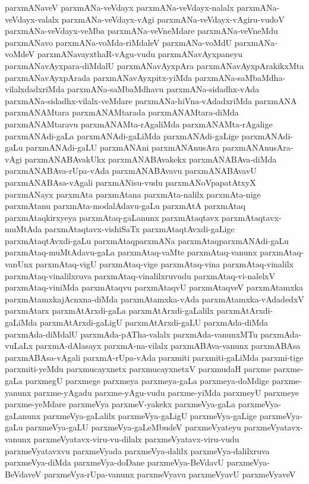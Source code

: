 {parxmANaveV
parxmANa-veVdayx
parxmANa-veVdayx-nalalx
parxmANa-veVdayx-valalx
parxmANa-veVdayx-vAgi
parxmANa-veVdayx-vAgiru-vudoV
parxmANa-veVdayx-veMba
parxmANa-veVneMdare
parxmANa-veVneMdu
parxmANavo
parxmANa-voMda-riMdaleV
parxmANa-voMdU
parxmANa-voMdeV
parxmANavayxthaR-vAgu-vudu
parxmANavAyxpaneyu
parxmANavAyxpara-diMdalU
parxmANavAyxpAra
parxmANavAyxpArakikxMta
parxmANavAyxpArada
parxmANavAyxpitx-yiMda
parxmANa-saMbaMdha-vilalxdadxriMda
parxmANa-saMbaMdhavu
parxmANa-sidadhx-vAda
parxmANa-sidadhx-vilalx-veMdare
parxmANa-hiVna-vAdadxriMda
parxmANA
parxmANAMtara
parxmANAMtarada
parxmANAMtara-diMda
parxmANAMtaravu
parxmANAMta-rAgaliMda
parxmANAMta-rAgalige
parxmANAdi-gaLa
parxmANAdi-gaLiMda
parxmANAdi-gaLige
parxmANAdi-gaLu
parxmANAdi-gaLU
parxmANAni
parxmANAnusAra
parxmANAnusAra-vAgi
parxmANABAvakUkx
parxmANABAvakekx
parxmANABAva-diMda
parxmANABAva-rUpa-vAda
parxmANABAvavu
parxmANABAvavU
parxmANABAsa-vAgali
parxmANisu-vudu
parxmANoVpapatAtxyX
parxmANayx
parxmAta
parxmAtana
parxmAta-nalilx
parxmAta-nige
parxmAtanu
parxmAta-modalAdavu-gaLu
parxmAtA
parxmAtaq
parxmAtaqkirxyeya
parxmAtaq-gaLanunx
parxmAtaqtavx
parxmAtaqtavx-muMtAda
parxmAtaqtavx-vishiSaTx
parxmAtaqtAvxdi-gaLige
parxmAtaqtAvxdi-gaLu
parxmAtaqparxmANa
parxmAtaqparxmANAdi-gaLu
parxmAtaq-muMtAdavu-gaLa
parxmAtaq-vaMte
parxmAtaq-vanunx
parxmAtaq-vanUnx
parxmAtaq-vigU
parxmAtaq-vige
parxmAtaq-vina
parxmAtaq-vinalilx
parxmAtaq-vinalilxruva
parxmAtaq-vinalilxruvudu
parxmAtaq-vi-nalelxV
parxmAtaq-viniMda
parxmAtaqvu
parxmAtaqvU
parxmAtaqveV
parxmAtamxka
parxmAtamxkajAcnxna-diMda
parxmAtamxka-vAda
parxmAtamxka-vAdadedxV
parxmAtarx
parxmAtArxdi-gaLa
parxmAtArxdi-gaLalilx
parxmAtArxdi-gaLiMda
parxmAtArxdi-gaLigU
parxmAtArxdi-gaLU
parxmAda-diMda
parxmAda-diMdalU
parxmAda-pATha-valalx
parxmAda-vanunxMTu
parxmAda-vuLaLx
parxmA-dAlasayx
parxmA-na-vilalx
parxmABAva-vanunx
parxmABAsa
parxmABAsa-vAgali
parxmA-rUpa-vAda
parxmiti
parxmiti-gaLiMda
parxmi-tige
parxmiti-yeMdu
parxmucayxnetx
parxmucayxnetxV
parxmudaH
parxme
parxme-gaLa
parxmegU
parxmege
parxmeya
parxmeya-gaLa
parxmeya-doMdige
parxme-yanunx
parxme-yAgadu
parxme-yAgu-vudu
parxme-yiMda
parxmeyU
parxmeye
parxme-yeMdare
parxmeVya
parxmeV-yakekx
parxmeVya-gaLa
parxmeVya-gaLanunx
parxmeVya-gaLalilx
parxmeVya-gaLigU
parxmeVya-gaLige
parxmeVya-gaLu
parxmeVya-gaLU
parxmeVya-gaLeMbudeV
parxmeVyateyu
parxmeVyatavx-vanunx
parxmeVyatavx-viru-vu-dilalx
parxmeVyatavx-viru-vudu
parxmeVyatavxvu
parxmeVyada
parxmeVya-dalilx
parxmeVya-dalilxruva
parxmeVya-diMda
parxmeVya-doDane
parxmeVya-BeVdavU
parxmeVya-BeVdaveV
parxmeVya-rUpa-vanunx
parxmeVyavu
parxmeVyavU
parxmeVyaveV
}
